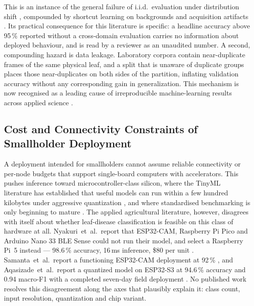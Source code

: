 \documentclass[journal]{IEEEtran}
\begin{document}
This is an instance of the general failure of i.i.d.\ evaluation under
distribution shift
\cite{torralba2011unbiased,recht2019imagenet,koh2021wilds}, compounded by
shortcut learning on backgrounds and acquisition artifacts
\cite{geirhos2020shortcut}. Its practical consequence for this literature
is specific: a headline accuracy above 95\,\% reported without a
cross-domain evaluation carries no information about deployed behaviour,
and is read by a reviewer as an unaudited number. A second, compounding
hazard is data leakage. Laboratory corpora contain near-duplicate frames of
the same physical leaf, and a split that is unaware of duplicate groups
places those near-duplicates on both sides of the partition, inflating
validation accuracy without any corresponding gain in generalization. This
mechanism is now recognised as a leading cause of irreproducible
machine-learning results across applied science \cite{kapoor2023leakage}.

\subsection{Cost and Connectivity Constraints of Smallholder Deployment}

A deployment intended for smallholders cannot assume reliable connectivity
or per-node budgets that support single-board computers with accelerators.
This pushes inference toward microcontroller-class silicon, where the TinyML
literature has established that useful models can run within a few hundred
kilobytes \cite{warden2019tinyml,david2021tflm,lin2020mcunet,lin2021mcunetv2}
under aggressive quantization \cite{jacob2018quantization,krishnamoorthi2018whitepaper},
and where standardised benchmarking is only beginning to mature
\cite{banbury2021mlperftiny}. The applied agricultural literature,
however, disagrees with itself about whether leaf-disease classification is
feasible on this class of hardware at all. Nyakuri~et~al.\ report that
ESP32-CAM, Raspberry Pi Pico and Arduino Nano 33 BLE Sense could not run
their model, and select a Raspberry Pi~5 instead --- 98.6\,\% accuracy,
16\,ms inference, \$80 per unit \cite{nyakuri2025aiiot}. Samanta~et~al.\
report a functioning ESP32-CAM deployment at 92\,\%
\cite{samanta2024leafsense}, and Aqasizade~et~al.\ report a quantized model
on ESP32-S3 at 94.6\,\% accuracy and 0.94 macro-F1 with a completed
seven-day field deployment \cite{aqasizade2026tinymlops}. No published work
resolves this disagreement along the axes that plausibly explain it: class
count, input resolution, quantization and chip variant.
\end{document}
